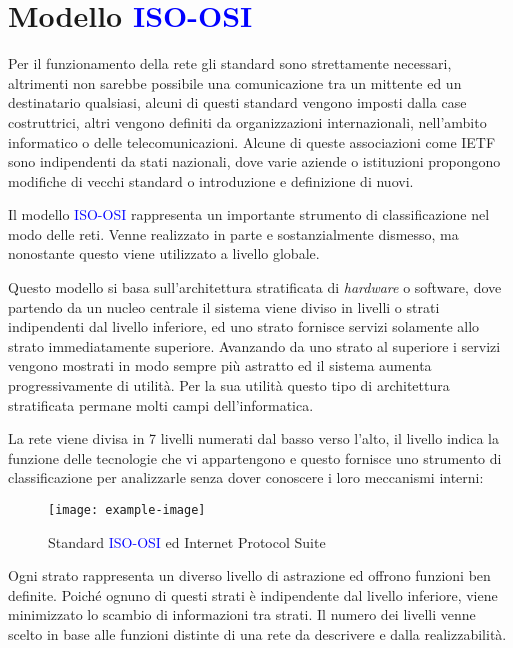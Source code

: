 \documentclass{article}
\numberwithin{equation}{subsection}
\begin{document}
\clearpage

\section{Modello \textcolor{blue}{ISO-OSI}}

Per il funzionamento della rete gli standard sono strettamente necessari, altrimenti non sarebbe possibile una comunicazione tra un mittente ed un destinatario qualsiasi, 
alcuni di questi standard vengono imposti dalla case costruttrici, altri vengono definiti da organizzazioni internazionali, nell'ambito informatico o delle 
telecomunicazioni. Alcune di queste associazioni come IETF sono indipendenti da stati nazionali, dove varie aziende o istituzioni propongono modifiche di vecchi 
standard o introduzione e definizione di nuovi. 

Il modello \textcolor{blue}{ISO-OSI} rappresenta un importante strumento di classificazione nel modo delle reti. Venne realizzato in parte e sostanzialmente dismesso, ma nonostante 
questo viene utilizzato a livello globale. 

Questo modello si basa sull'architettura stratificata di \textit{hardware} o software, dove partendo da un nucleo centrale il sistema viene diviso in livelli o strati 
indipendenti dal livello inferiore, ed uno strato fornisce servizi solamente allo strato immediatamente superiore. Avanzando da uno strato al superiore i servizi vengono mostrati in modo 
sempre più astratto ed il sistema aumenta progressivamente di utilità. Per la sua utilità questo tipo di architettura stratificata permane molti campi dell'informatica. 

La rete viene divisa in 7 livelli numerati dal basso verso l'alto, il livello indica la funzione delle tecnologie che vi appartengono e questo fornisce uno strumento di 
classificazione per analizzarle senza dover conoscere i loro meccanismi interni:

\begin{figure}[H]%
    \centering%
    \texttt{[image: example-image]}%
    \caption{Standard \textcolor{blue}{ISO-OSI} ed Internet Protocol Suite}%
\end{figure}

Ogni strato rappresenta un diverso livello di astrazione ed offrono funzioni ben definite. Poiché ognuno di questi strati è indipendente dal livello inferiore, viene minimizzato lo scambio 
di informazioni tra strati. Il numero dei livelli venne scelto in base alle funzioni distinte di una rete da descrivere e dalla realizzabilità. 
\end{document}
